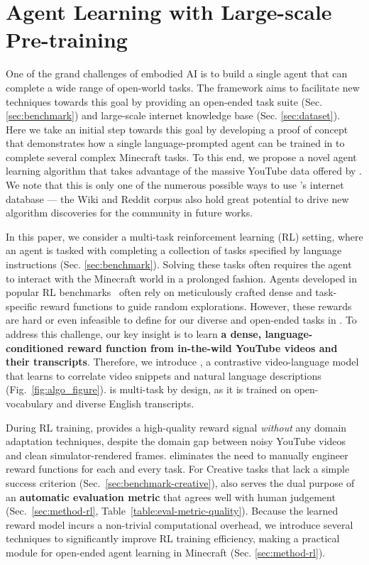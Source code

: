 \section{Agent Learning with Large-scale Pre-training}

\label{sec:method}

One of the grand challenges of embodied AI is to build a single agent that can complete a wide range of open-world tasks.
The \minedojo framework aims to facilitate new techniques towards this goal by providing an open-ended task suite (Sec. \ref{sec:benchmark}) and large-scale internet knowledge base (Sec. \ref{sec:dataset}). 
Here we take an initial step towards this goal by developing a proof of concept that demonstrates how a single language-prompted agent can be trained in \minedojo to complete several complex Minecraft tasks.
To this end, we propose a novel agent learning algorithm that takes advantage of the massive YouTube data offered by \minedojo. We note that this is only one of the numerous possible ways to use \minedojo's internet database --- the Wiki and Reddit corpus also hold great potential to drive new algorithm discoveries for the community in future works. 


In this paper, we consider a multi-task reinforcement learning (RL) setting, where an agent is tasked with completing a collection of \minedojo tasks specified by language instructions (Sec. \ref{sec:benchmark}). 
Solving these tasks often requires the agent to interact with the Minecraft world in a prolonged fashion. Agents developed in popular RL benchmarks~\cite{tassa2018deepmind,zhu2020robosuite} often rely on meticulously crafted dense and task-specific reward functions to guide random explorations. However, these rewards are hard or even infeasible to define for our diverse and open-ended tasks in \minedojo.
To address this challenge, our key insight is to learn \textbf{a dense, language-conditioned reward function from in-the-wild YouTube videos and their transcripts}. Therefore, we introduce \textbf{\mineclip}, a contrastive video-language model that learns to correlate video snippets and natural language descriptions (Fig.~\ref{fig:algo_figure}). \mineclip is multi-task by design, as it is trained on open-vocabulary and diverse English transcripts. 

During RL training, \mineclip provides a high-quality reward signal \textit{without} any domain adaptation techniques, despite the domain gap between noisy YouTube videos and clean simulator-rendered frames. 
\mineclip eliminates the need to manually engineer reward functions for each and every \minedojo task.
For Creative tasks that lack a simple success criterion (Sec.~\ref{sec:benchmark-creative}), \mineclip also serves the dual purpose of an \textbf{automatic evaluation metric} that agrees well with human judgement  (Sec.~\ref{sec:method-rl}, Table~\ref{table:eval-metric-quality}).  
Because the learned reward model incurs a non-trivial computational overhead, we introduce several techniques to significantly improve RL training efficiency, making \mineclip a practical module for open-ended agent learning in Minecraft (Sec. \ref{sec:method-rl}).

